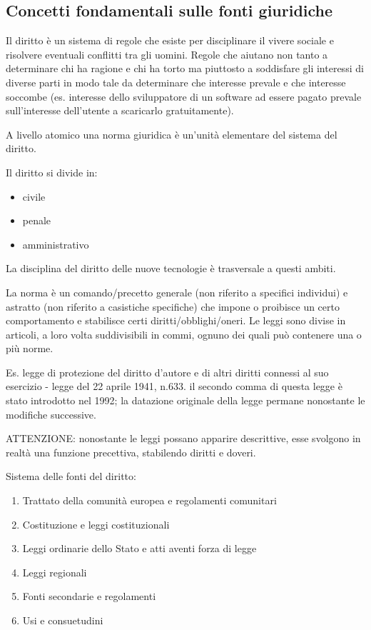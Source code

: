 
\subsection{Concetti fondamentali sulle fonti giuridiche}

Il diritto è un sistema di regole che esiste per disciplinare il vivere sociale e risolvere eventuali conflitti tra gli uomini. 
Regole che aiutano non tanto a determinare chi ha ragione e chi ha torto ma piuttosto a soddisfare gli interessi di diverse parti in modo tale da determinare che interesse prevale e che interesse soccombe (es. interesse dello sviluppatore di un software ad essere pagato prevale sull'interesse dell'utente a scaricarlo gratuitamente).

A livello atomico una norma giuridica è un'unità elementare del sistema del diritto. 

Il diritto si divide in:
\begin{itemize}
    \item civile
    \item penale
    \item amministrativo
\end{itemize}

La disciplina del diritto delle nuove tecnologie è trasversale a questi ambiti.


La norma è un comando/precetto generale (non riferito a specifici individui) e astratto (non riferito a casistiche specifiche) che impone o proibisce un certo comportamento e stabilisce certi diritti/obblighi/oneri. Le leggi sono divise in articoli, a loro volta suddivisibili in commi, ognuno dei quali può contenere una o più norme.

Es. legge di protezione del diritto d'autore e di altri diritti connessi al suo esercizio - legge del 22 aprile 1941, n.633. il secondo comma di questa legge è stato introdotto nel 1992; la datazione originale della legge permane nonostante le modifiche successive.

ATTENZIONE: nonostante le leggi possano apparire descrittive, esse svolgono in realtà una funzione precettiva, stabilendo diritti e doveri. 


Sistema delle fonti del diritto:
\begin{enumerate}
    \item Trattato della comunità europea e regolamenti comunitari
    \item Costituzione e leggi costituzionali
    \item Leggi ordinarie dello Stato e atti aventi forza di legge 
    \item Leggi regionali
    \item Fonti secondarie e regolamenti
    \item Usi e consuetudini
\end{enumerate}


